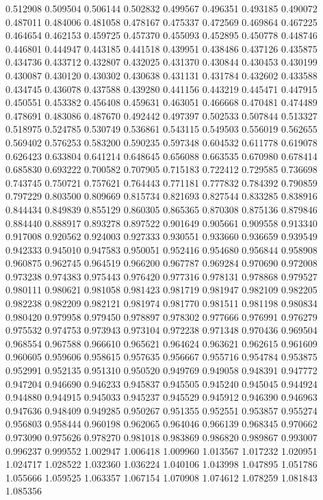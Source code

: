0.512908
0.509504
0.506144
0.502832
0.499567
0.496351
0.493185
0.490072
0.487011
0.484006
0.481058
0.478167
0.475337
0.472569
0.469864
0.467225
0.464654
0.462153
0.459725
0.457370
0.455093
0.452895
0.450778
0.448746
0.446801
0.444947
0.443185
0.441518
0.439951
0.438486
0.437126
0.435875
0.434736
0.433712
0.432807
0.432025
0.431370
0.430844
0.430453
0.430199
0.430087
0.430120
0.430302
0.430638
0.431131
0.431784
0.432602
0.433588
0.434745
0.436078
0.437588
0.439280
0.441156
0.443219
0.445471
0.447915
0.450551
0.453382
0.456408
0.459631
0.463051
0.466668
0.470481
0.474489
0.478691
0.483086
0.487670
0.492442
0.497397
0.502533
0.507844
0.513327
0.518975
0.524785
0.530749
0.536861
0.543115
0.549503
0.556019
0.562655
0.569402
0.576253
0.583200
0.590235
0.597348
0.604532
0.611778
0.619078
0.626423
0.633804
0.641214
0.648645
0.656088
0.663535
0.670980
0.678414
0.685830
0.693222
0.700582
0.707905
0.715183
0.722412
0.729585
0.736698
0.743745
0.750721
0.757621
0.764443
0.771181
0.777832
0.784392
0.790859
0.797229
0.803500
0.809669
0.815734
0.821693
0.827544
0.833285
0.838916
0.844434
0.849839
0.855129
0.860305
0.865365
0.870308
0.875136
0.879846
0.884440
0.888917
0.893278
0.897522
0.901649
0.905661
0.909558
0.913340
0.917008
0.920562
0.924003
0.927333
0.930551
0.933660
0.936659
0.939549
0.942333
0.945010
0.947583
0.950051
0.952416
0.954680
0.956844
0.958908
0.960875
0.962745
0.964519
0.966200
0.967787
0.969284
0.970690
0.972008
0.973238
0.974383
0.975443
0.976420
0.977316
0.978131
0.978868
0.979527
0.980111
0.980621
0.981058
0.981423
0.981719
0.981947
0.982109
0.982205
0.982238
0.982209
0.982121
0.981974
0.981770
0.981511
0.981198
0.980834
0.980420
0.979958
0.979450
0.978897
0.978302
0.977666
0.976991
0.976279
0.975532
0.974753
0.973943
0.973104
0.972238
0.971348
0.970436
0.969504
0.968554
0.967588
0.966610
0.965621
0.964624
0.963621
0.962615
0.961609
0.960605
0.959606
0.958615
0.957635
0.956667
0.955716
0.954784
0.953875
0.952991
0.952135
0.951310
0.950520
0.949769
0.949058
0.948391
0.947772
0.947204
0.946690
0.946233
0.945837
0.945505
0.945240
0.945045
0.944924
0.944880
0.944915
0.945033
0.945237
0.945529
0.945912
0.946390
0.946963
0.947636
0.948409
0.949285
0.950267
0.951355
0.952551
0.953857
0.955274
0.956803
0.958444
0.960198
0.962065
0.964046
0.966139
0.968345
0.970662
0.973090
0.975626
0.978270
0.981018
0.983869
0.986820
0.989867
0.993007
0.996237
0.999552
1.002947
1.006418
1.009960
1.013567
1.017232
1.020951
1.024717
1.028522
1.032360
1.036224
1.040106
1.043998
1.047895
1.051786
1.055666
1.059525
1.063357
1.067154
1.070908
1.074612
1.078259
1.081843
1.085356
